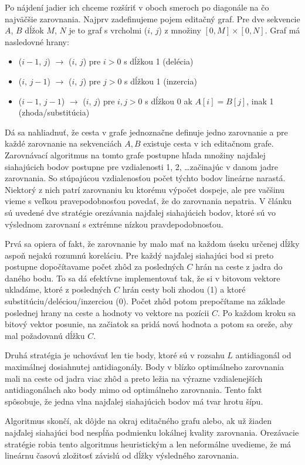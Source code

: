 Po nájdení jadier ich chceme rozšíriť v oboch smeroch po diagonále na čo najväčšie zarovnania. Najprv zadefinujeme pojem editačný graf. Pre dve sekvencie $A$, $B$ dĺžok $M$, $N$ je to graf s vrcholmi ($i$, $j$) z množiny $[0, M] \times [0, N]$. Graf má nasledovné hrany:
\begin{itemize}
\item  ($i-1$, $j$) $\longrightarrow$  ($i$, $j$) pre $i > 0$ s dĺžkou 1 (delécia)
\item  ($i$, $j - 1$) $\longrightarrow$  ($i$, $j$) pre $j > 0$ s dĺžkou 1 (inzercia)
\item  ($i - 1$, $j - 1$) $\longrightarrow$  ($i$, $j$) pre $i, j > 0$ s dĺžkou 0 ak $A[i] = B[j]$, inak 1 (zhoda/substitúcia)
\end{itemize}
Dá sa nahliadnuť, že cesta v grafe jednoznačne definuje jedno zarovnanie a pre každé zarovnanie na sekvenciách $A, B$ existuje  cesta v ich editačnom grafe. Zarovnávací algoritmus na tomto grafe postupne hľada množiny najďalej siahajúcich bodov postupne pre vzdialenosti 1, 2, \dots začinajúc v danom jadre zarovnania. So stúpajúcou vzdialenosťou počet týchto bodov lineárne narastá. Niektorý z nich patrí zarovnaniu ku ktorému výpočet dospeje, ale pre vačšinu vieme s veľkou pravepodobnosťou povedať, že do zarovnania nepatria. V článku sú uvedené dve stratégie orezávania najďalej siahajúcich bodov, ktoré sú vo výslednom zarovnaní s extrémne nízkou pravdepodobnosťou. 

Prvá sa opiera of fakt, že zarovnanie by malo mať na každom úseku určenej dĺžky aspoň nejakú rozumnú koreláciu. Pre každý najďalej siahajúci bod si preto postupne dopočítavame počet zhôd za posledných $C$ hrán na ceste z jadra do daného bodu. To sa dá efektívne implementovať tak, že si v bitovom vektore ukladáme, ktoré z posledných $C$ hrán cesty boli zhodou (1) a ktoré substitúciu/deléciou/inzerciou (0). Počet zhôd potom prepočítame na základe poslednej hrany na ceste a hodnoty vo vektore na pozícii $C$. Po každom kroku sa bitový vektor posunie, na začiatok sa pridá nová hodnota a potom sa oreže, aby mal požadovanú dĺžku $C$.

Druhá stratégia je uchovávať len tie body, ktoré sú v rozsahu $L$ antidiagonál od maximálnej dosiahnutej antidiagonály. Body v blízko optimálneho zarovnania mali na ceste od jadra viac zhôd a preto ležia na výrazne vzdialenejších antidiagonálach ako body mimo od optimálneho zarovnania. Tento fakt spôsobuje, že jedna vlna najďalej siahajúcich bodov má tvar hrotu šípu.

Algoritmus skončí, ak dôjde na okraj editačného grafu alebo, ak už žiaden najďalej siahajúci bod nespĺňa podmienku lokálnej kvality zarovnania. Orezá\-vacie stratégie robia tento algoritmus heuristickým a len neformálne uvedieme, že má lineárnu časovú zložitosť závislú od dĺžky výsledného zarovnania.

